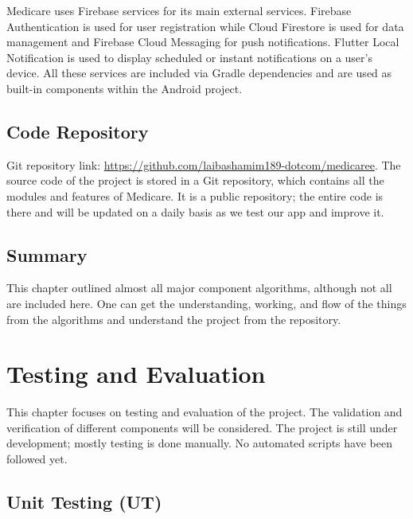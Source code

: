 \documentclass[12pt, a4paper, oneside]{report}
\begin{document}
Medicare uses Firebase services for its main external services. Firebase Authentication is used for user registration while Cloud Firestore is used for data management and Firebase Cloud Messaging for push notifications. Flutter Local Notification is used to display scheduled or instant notifications on a user's device. All these services are included via Gradle dependencies and are used as built-in components within the Android project.

\section{Code Repository}

Git repository link: \url{https://github.com/laibashamim189-dotcom/medicaree}. The source code of the project is stored in a Git repository, which contains all the modules and features of Medicare. It is a public repository; the entire code is there and will be updated on a daily basis as we test our app and improve it.

\section{Summary}

This chapter outlined almost all major component algorithms, although not all are included here. One can get the understanding, working, and flow of the things from the algorithms and understand the project from the repository.

\chapter{Testing and Evaluation}
\label{ch:testing}

This chapter focuses on testing and evaluation of the project. The validation and verification of different components will be considered. The project is still under development; mostly testing is done manually. No automated scripts have been followed yet.

\section{Unit Testing (UT)}
\end{document}
